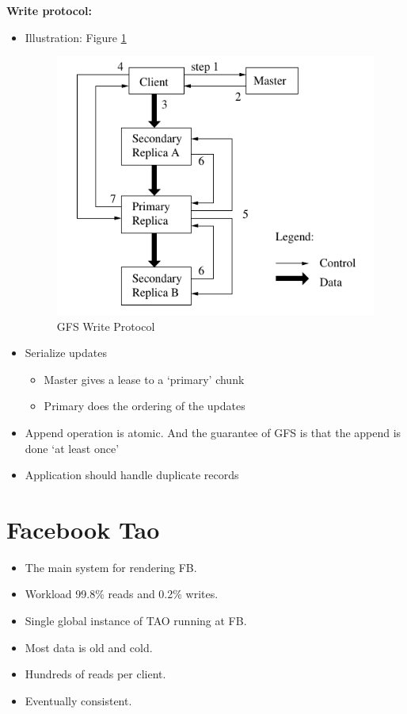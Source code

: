 \documentclass[parskip=half]{scrartcl}
\begin{document}
    \textbf{Write protocol:}
    \begin{itemize}
        \item 
        Illustration: Figure \ref{fig:gfs-write-protocol}
        \begin{figure}[ht]
            \centering
            \includegraphics[width=.6\textwidth]{gfs-write-protocol}
            \caption{GFS Write Protocol}
            \label{fig:gfs-write-protocol}
        \end{figure}
        \item 
        Serialize updates 
        \begin{itemize}
            \item 
            Master gives a lease to a `primary' chunk
            \item 
            Primary does the ordering of the updates
        \end{itemize}
        \item 
        Append operation is atomic. And the guarantee of GFS is that the append is done `at least once'
        \item 
        Application should handle duplicate records
    \end{itemize}



\newpage


\section{Facebook Tao} %
\label{sec:facebook_tao}

    \begin{itemize}
        \item 
        The main system for rendering FB.
        \item 
        Workload  99.8\% reads and 0.2\% writes.
        \item 
        Single global instance of TAO running at FB.
        \item 
        Most data is old and cold.
        \item 
        Hundreds of reads per client.
        \item 
        Eventually consistent. 
    \end{itemize}
\end{document}
